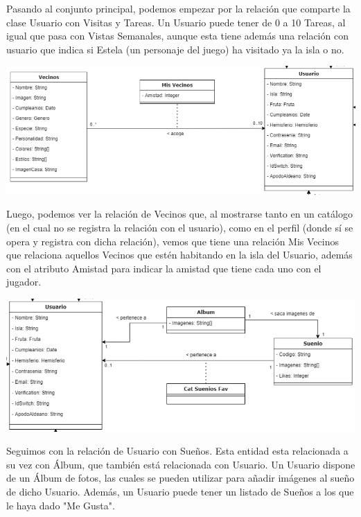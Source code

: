 		\bigskip
	
	Pasando al conjunto principal, podemos empezar por la relación que comparte la clase Usuario con Visitas y Tareas. Un Usuario puede tener de 0 a 10 Tareas, al igual que pasa con Vistas Semanales, aunque esta tiene además una relación con usuario que indica si Estela (un personaje del juego) ha visitado ya la isla o no.\\
	
		\bigskip
	
	\includegraphics[width=\textwidth]{img/cap5/diagramaclases/vecinos.png}
	
		\bigskip
	
	Luego, podemos ver la relación de Vecinos que, al mostrarse tanto en un catálogo (en el cual no se registra la relación con el usuario), como en el perfil (donde sí se opera y registra con dicha relación), vemos que tiene una relación Mis Vecinos que relaciona aquellos Vecinos que estén habitando en la isla del Usuario, además con el atributo Amistad para indicar la amistad que tiene cada uno con el jugador.\\
	
	\clearpage
	
	\includegraphics[width=\textwidth]{img/cap5/diagramaclases/suenios.png}
	
		\bigskip
	
	Seguimos con la relación de Usuario con Sueños. Esta entidad esta relacionada a su vez con Álbum, que también está relacionada con Usuario. Un Usuario dispone de un Álbum de fotos, las cuales se pueden utilizar para añadir imágenes al sueño de dicho Usuario. Además, un Usuario puede tener un listado de Sueños a los que le haya dado "Me Gusta".\\ 
	
